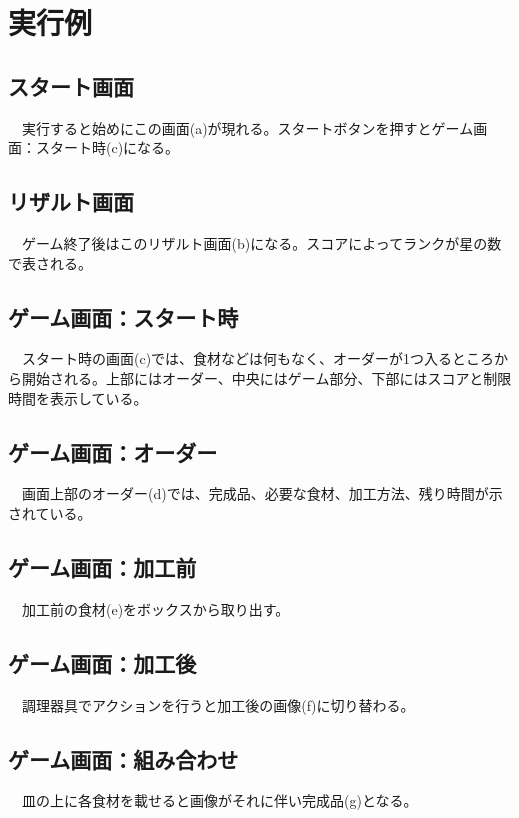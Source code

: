 \documentclass[a4j]{jarticle} %
\begin{document}
\section{実行例}
\subsection*{スタート画面}
　実行すると始めにこの画面(a)が現れる。スタートボタンを押すとゲーム画面：スタート時(c)になる。
\subsection*{リザルト画面}
　ゲーム終了後はこのリザルト画面(b)になる。スコアによってランクが星の数で表される。
\subsection*{ゲーム画面：スタート時}
　スタート時の画面(c)では、食材などは何もなく、オーダーが1つ入るところから開始される。上部にはオーダー、中央にはゲーム部分、下部にはスコアと制限時間を表示している。
\subsection*{ゲーム画面：オーダー}
　画面上部のオーダー(d)では、完成品、必要な食材、加工方法、残り時間が示されている。
\subsection*{ゲーム画面：加工前}
　加工前の食材(e)をボックスから取り出す。
\subsection*{ゲーム画面：加工後}
　調理器具でアクションを行うと加工後の画像(f)に切り替わる。
\subsection*{ゲーム画面：組み合わせ}
　皿の上に各食材を載せると画像がそれに伴い完成品(g)となる。
\end{document}
